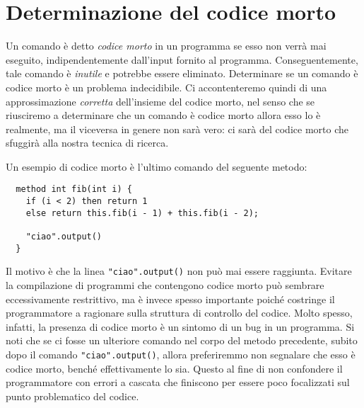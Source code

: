 \section{Determinazione del codice morto}\label{sec:dead_code}
%
Un comando \`e detto \emph{codice morto} in un programma se esso non
verr\`a mai eseguito, indipendentemente dall'input fornito al programma.
Conseguentemente, tale comando \`e \emph{inutile} e potrebbe essere eliminato.
Determinare se un comando \`e codice morto \`e un problema indecidibile.
Ci accontenteremo quindi di una approssimazione \emph{corretta} dell'insieme
del codice morto, nel senso che
se riusciremo a determinare che un comando \`e codice morto allora esso
lo \`e realmente, ma il viceversa in genere non sar\`a vero: ci sar\`a
del codice morto che sfuggir\`a alla nostra tecnica di ricerca.

Un esempio di codice morto \`e l'ultimo comando del seguente metodo:
%
\begin{verbatim}
  method int fib(int i) {
    if (i < 2) then return 1
    else return this.fib(i - 1) + this.fib(i - 2);

    "ciao".output()
  }
\end{verbatim}
%
Il motivo \`e che la linea \verb!"ciao".output()! non pu\`o mai essere
raggiunta. Evitare la compilazione
di programmi che contengono codice morto pu\`o sembrare eccessivamente
restrittivo, ma \`e invece spesso importante poich\'e costringe il
programmatore a ragionare sulla struttura di controllo del codice.
Molto spesso, infatti, la presenza di codice morto \`e un sintomo di
un bug in un programma.
%
%
Si noti che se ci fosse un ulteriore comando nel corpo del metodo precedente,
subito dopo il comando \verb!"ciao".output()!, allora preferiremmo
non segnalare che esso \`e codice morto, bench\'e effettivamente lo sia.
Questo al fine di non confondere il programmatore con errori a cascata che
finiscono per essere poco focalizzati sul punto problematico del codice.

